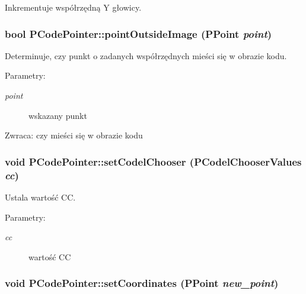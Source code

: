 Inkrementuje współrzędną Y głowicy. \hypertarget{classPCodePointer_a9e836354b61f96ed39208c8b37d57d3}{
\subsubsection[{pointOutsideImage}]{\setlength{\rightskip}{0pt plus 5cm}bool PCodePointer::pointOutsideImage (PPoint {\em point})}}
\label{classPCodePointer_a9e836354b61f96ed39208c8b37d57d3}


Determinuje, czy punkt o zadanych współrzędnych mieści się w obrazie kodu. \begin{Desc}
\item[Parametry:]
\begin{description}
\item[{\em point}]wskazany punkt \end{description}
\end{Desc}
\begin{Desc}
\item[Zwraca:]czy mieści się w obrazie kodu \end{Desc}
\hypertarget{classPCodePointer_b5c13bf294dddd672ca9fe7675eb258b}{
\subsubsection[{setCodelChooser}]{\setlength{\rightskip}{0pt plus 5cm}void PCodePointer::setCodelChooser ({\bf PCodelChooserValues} {\em cc})}}
\label{classPCodePointer_b5c13bf294dddd672ca9fe7675eb258b}


Ustala wartość CC. \begin{Desc}
\item[Parametry:]
\begin{description}
\item[{\em cc}]wartość CC \end{description}
\end{Desc}
\hypertarget{classPCodePointer_117bf9322b4fdcb189c41a6f2f113a4b}{
\subsubsection[{setCoordinates}]{\setlength{\rightskip}{0pt plus 5cm}void PCodePointer::setCoordinates (PPoint {\em new\_\-point})}}
\label{classPCodePointer_117bf9322b4fdcb189c41a6f2f113a4b}


